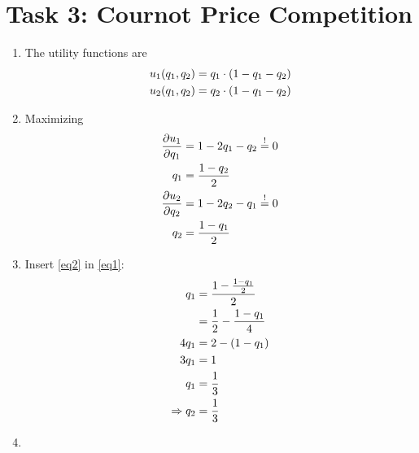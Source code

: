 \documentclass{article}
\begin{document}
	\section*{Task 3: Cournot Price Competition}
	\begin{enumerate}[label=(\alph*)]
		\item The utility functions are
		\begin{align}
			u_1(q_1,q_2) &= q_1 \cdot (1 - q_1 - q_2) \notag \\
			u_2(q_1,q_2) &= q_2 \cdot (1 - q_1 - q_2) \notag
		\end{align}
		\item Maximizing
		\begin{align}
			\frac{\partial u_1}{\partial q_1} &= 1 - 2q_1 - q_2 \overset{!}{=} 0 \notag \\
			q_1 &= \frac{1-q_2}{2} \label{eq1} \\
			\frac{\partial u_2}{\partial q_2} &= 1 - 2q_2 - q_1 \overset{!}{=} 0 \notag \\
			q_2 &= \frac{1-q_1}{2} \label{eq2}
		\end{align}
		\item Insert \eqref{eq2} in \eqref{eq1}:
		\begin{align}
			q_1 &= \frac{1 - \frac{1 - q_1}{2}}{2} \notag \\
			&= \frac{1}{2} - \frac{1-q_1}{4} \notag \\
			4q_1 &= 2 - (1 - q_1) \notag \\
			3q_1 &= 1 \notag \\
			q_1 &= \frac{1}{3} \notag \\
			\Rightarrow q_2 &= \frac{1}{3} \notag
		\end{align}
		\item 
	\end{enumerate}
\end{document}
